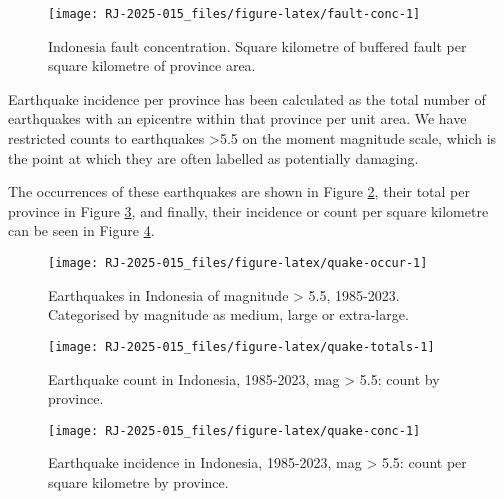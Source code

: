 \begin{figure}

{\centering \texttt{[image: RJ-2025-015\_files/figure-latex/fault-conc-1]} 

}

\caption{Indonesia fault concentration. Square kilometre of buffered fault per square kilometre of province area. }\label{fig:fault-conc}
\end{figure}

Earthquake incidence per province has been calculated as the total number of earthquakes with
an epicentre within that province per unit area. We have
restricted counts to earthquakes \textgreater5.5 on the moment magnitude scale, which is the point
at which they are often labelled as potentially damaging.

The occurrences of these earthquakes are shown in Figure \ref{fig:quake-occur}, their total per province in Figure \ref{fig:quake-totals}, and finally, their incidence or count per square kilometre can be seen in Figure \ref{fig:quake-conc}.

\begin{figure}

{\centering \texttt{[image: RJ-2025-015\_files/figure-latex/quake-occur-1]} 

}

\caption{Earthquakes in Indonesia of magnitude > 5.5, 1985-2023. Categorised by magnitude as medium, large or extra-large. }\label{fig:quake-occur}
\end{figure}

\begin{figure}

{\centering \texttt{[image: RJ-2025-015\_files/figure-latex/quake-totals-1]} 

}

\caption{Earthquake count in Indonesia, 1985-2023, mag > 5.5: count by province. }\label{fig:quake-totals}
\end{figure}

\begin{figure}

{\centering \texttt{[image: RJ-2025-015\_files/figure-latex/quake-conc-1]} 

}

\caption{Earthquake incidence in Indonesia, 1985-2023, mag > 5.5: count per square kilometre by province. }\label{fig:quake-conc}
\end{figure}

